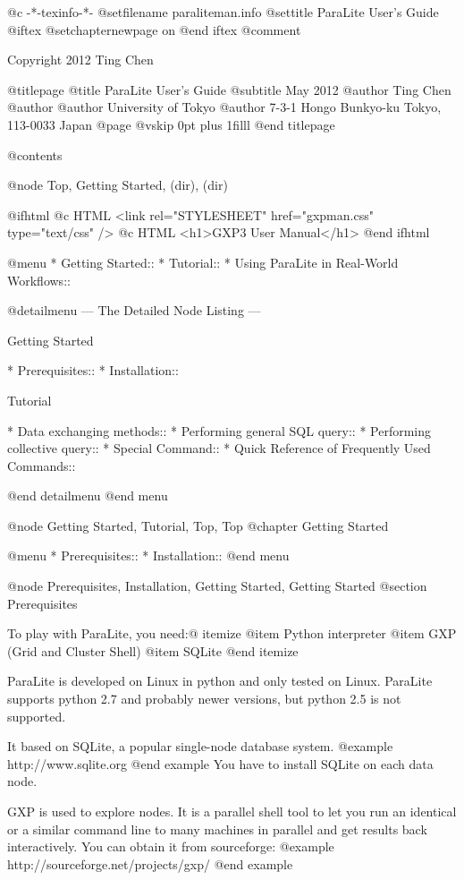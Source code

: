   @c -*-texinfo-*-
@setfilename paraliteman.info
@settitle ParaLite User's Guide
@iftex
@setchapternewpage on
@end iftex
@comment %

Copyright 2012 Ting Chen

@titlepage
@title ParaLite User's Guide
@subtitle May 2012
@author Ting Chen
@author
@author University of Tokyo
@author 7-3-1 Hongo Bunkyo-ku Tokyo, 113-0033 Japan
@page
@vskip 0pt plus 1filll
@end titlepage

@contents

@node Top, Getting Started, (dir), (dir)

@ifhtml
@c HTML <link rel="STYLESHEET" href="gxpman.css" type="text/css" />
@c HTML <h1>GXP3 User Manual</h1>
@end ifhtml

@menu
* Getting Started::             
* Tutorial::                    
* Using ParaLite in Real-World Workflows::  

@detailmenu
 --- The Detailed Node Listing ---

Getting Started

* Prerequisites::
* Installation::                

Tutorial

* Data exchanging methods::
* Performing general SQL query::   
* Performing collective query::  
* Special Command::
* Quick Reference of Frequently Used Commands::  

@end detailmenu
@end menu

@node Getting Started, Tutorial, Top, Top
@chapter Getting Started


@menu
* Prerequisites::               
* Installation::                
@end menu

@node Prerequisites, Installation, Getting Started, Getting Started
@section Prerequisites

To play with ParaLite, you need:@
itemize
@item Python interpreter
@item GXP (Grid and Cluster Shell)
@item SQLite
@end itemize

ParaLite is developed on Linux in python and only tested on Linux. ParaLite supports python 2.7 and probably newer versions, but python 2.5 is 
not supported.

It based on SQLite, a popular single-node database system. 
@example
    http://www.sqlite.org
@end example
You have to install SQLite on each data node.

GXP is used to explore nodes. It is a parallel shell tool to let you 
run an identical or a similar command line to many machines in parallel 
and get results back interactively. You can obtain it from sourceforge:
@example
    http://sourceforge.net/projects/gxp/
@end example

